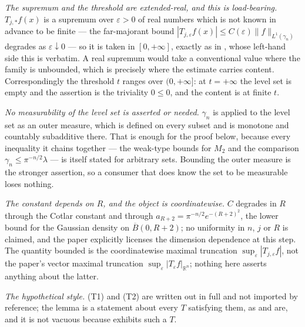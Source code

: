 \begin{lemma}
\emph{The supremum and the threshold are extended-real, and this is
load-bearing.}  $T_{j,*}f(x)$ is a supremum over $\varepsilon > 0$ of real
numbers which is not known in advance to be finite --- the far-majorant bound
$|T_{j,\varepsilon}f(x)| \leq C(\varepsilon)\|f\|_{L^1(\gamma_n)}$ degrades as
$\varepsilon \downarrow 0$ --- so it is taken in $[0,+\infty]$, exactly as in
, whose left-hand side this is verbatim.  A real
supremum would take a conventional value where the family is unbounded, which
is precisely where the estimate carries content.  Correspondingly the threshold
$t$ ranges over $(0,+\infty]$: at $t = +\infty$ the level set is empty and the
assertion is the triviality $0 \leq 0$, and the content is at finite $t$.

\emph{No measurability of the level set is asserted or needed.}  $\gamma_n$ is
applied to the level set as an outer measure, which is defined on every subset
and is monotone and countably subadditive there.  That is enough for the proof
below, because every inequality it chains together --- the weak-type bounds for
$M_2$ and the comparison $\gamma_n \leq \pi^{-n/2}\lambda$ --- is itself stated
for arbitrary sets.  Bounding the outer measure is the stronger assertion, so a
consumer that does know the set to be measurable loses nothing.

\emph{The constant depends on $R$, and the object is coordinatewise.}  $C$
degrades in $R$ through the Cotlar constant and through
$a_{R+2} = \pi^{-n/2}e^{-(R+2)^2}$, the lower bound for the Gaussian density on
$\overline B(0,R+2)$; no uniformity in $n$, $j$ or $R$ is claimed, and the paper
explicitly licenses the dimension dependence at this step.  The quantity
bounded is the coordinatewise maximal truncation
$\sup_\varepsilon|T_{j,\varepsilon}f|$, not the paper's vector maximal
truncation $\sup_\varepsilon|T_\varepsilon f|_{\mathbb{R}^n}$; nothing here
asserts anything about the latter.

\emph{The hypothetical style.}  (T1) and (T2) are written out in full and not
imported by reference; the lemma is a statement about every $T$ satisfying
them, as  and 
are, and it is not vacuous because  exhibits such a $T$.
\end{lemma}

